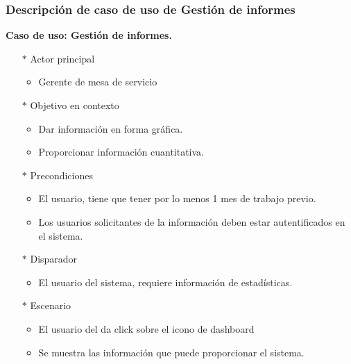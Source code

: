 \subsubsection{Descripción de caso de uso de Gestión de informes}

\begin{multicols}{2}
	\textbf{Caso de uso: Gestión de informes.}
	
	\begin{itemize}
		\item[$*$]  Actor principal
		\begin{itemize}
			\item Gerente de mesa de servicio 
		\end{itemize}
		\item[$*$]  Objetivo en contexto
		\begin{itemize}
			\item Dar información en forma gráfica.
			\item Proporcionar información cuantitativa.
		\end{itemize}
		\item[$*$]  Precondiciones
		\begin{itemize}
			\item El usuario, tiene que tener por lo menos 1 mes de trabajo previo.
			\item Los usuarios solicitantes de la información deben estar autentificados en el sistema.
			
		\end{itemize}	
		\item[$*$]  Disparador
		\begin{itemize}
			\item El usuario del sistema, requiere información de estadísticas.
		\end{itemize}
			\item[$*$]  Escenario
			\begin{itemize}
				\item El usuario del da click sobre el icono de dashboard
				\item Se muestra las  información que puede proporcionar el sistema. 
			\end{itemize}
			

\end{itemize}
\end{multicols}
